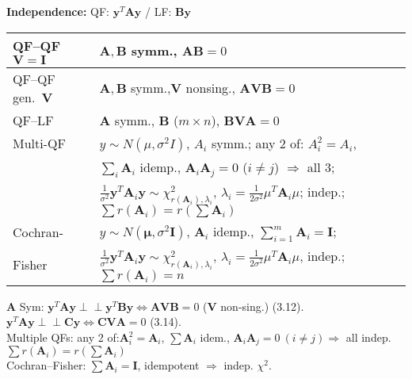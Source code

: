 \documentclass[10pt,landscape]{article}
\begin{document}
\begin{multicols}{3}
\medskip
\textbf{Independence:} QF: $\mathbf{y}^T\mathbf{A}\mathbf{y}$ / LF: $\mathbf{B}\mathbf{y}$
\begin{tabular}{|p{1.3cm}|p{5.7cm}|}
\hline
QF–QF $\mathbf{V}=\mathbf{I}$& $\mathbf{A},\mathbf{B}$ symm., $\mathbf{A}\mathbf{B}=0$\\
\hline
QF–QF gen.\ $\mathbf{V}$& $\mathbf{A},\mathbf{B}$ symm.,$\mathbf{V}$ nonsing., $\mathbf{A}\mathbf{V}\mathbf{B}=0$\\
\hline
QF–LF & $\mathbf{A}$ symm., $\mathbf{B}$ ($m\times n$), $\mathbf{B}\mathbf{V}\mathbf{A}=0$\\
\hline
Multi-QF & $y\!\sim\! N(\mu,\sigma^2{I})$, ${A}_i$ symm.; any 2 of: ${A}_i^2={A}_i$,\\
& $\sum_i \mathbf{A}_i$ idemp., $\mathbf{A}_i\mathbf{A}_j=0$ ($i\neq j$) $\Rightarrow$ all 3;\\
& $\frac{1}{\sigma^2}\mathbf{y}^T \mathbf{A}_i \mathbf{y} \sim \chi^2_{r(\mathbf{A}_i),\lambda_i}$, $\lambda_i=\frac{1}{2\sigma^2}\mu^T \mathbf{A}_i \mu$;
indep.;
$\sum r(\mathbf{A}_i)=r(\sum \mathbf{A}_i)$\\
\hline
Cochran-& $y\!\sim\! N(\boldsymbol\mu,\sigma^2\mathbf{I})$, $\mathbf{A}_i$ idemp., $\sum_{i=1}^m \mathbf{A}_i=\mathbf{I}$;\\
Fisher& $\frac{1}{\sigma^2}\mathbf{y}^T \mathbf{A}_i \mathbf{y} \sim \chi^2_{r(\mathbf{A}_i),\lambda_i}$, $\lambda_i=\frac{1}{2\sigma^2}\mu^T \mathbf{A}_i \mu$, indep.; $\sum r(\mathbf{A}_i)=n$\\
\hline
\end{tabular}

\medskip
$\mathbf{A}$ Sym:
$\mathbf{y}^T \mathbf{A} \mathbf{y} \perp\!\!\!\perp \mathbf{y}^T \mathbf{B} \mathbf{y} \Leftrightarrow \mathbf{A}\mathbf{V}\mathbf{B} = 0$ ($\mathbf{V}$ non-sing.) (3.12).
$\mathbf{y}^T \mathbf{A} \mathbf{y} \perp\!\!\!\perp \mathbf{C} \mathbf{y} \Leftrightarrow \mathbf{C}\mathbf{V}\mathbf{A} = 0$ (3.14).\\
\medskip
Multiple QFs: any 2 of:$\mathbf{A}_i^2 = \mathbf{A}_i$, $\sum \mathbf{A}_i$ idem., $\mathbf{A}_i \mathbf{A}_j=0 \ (i\neq j) \Rightarrow$ all indep. $\sum r(\mathbf{A}_i)=r(\sum \mathbf{A}_i)$\\
Cochran–Fisher: $\sum \mathbf{A}_i = \mathbf{I}$, idempotent $\Rightarrow$ indep. $\chi^2$.\\
\medskip

\end{multicols}
\end{document}
